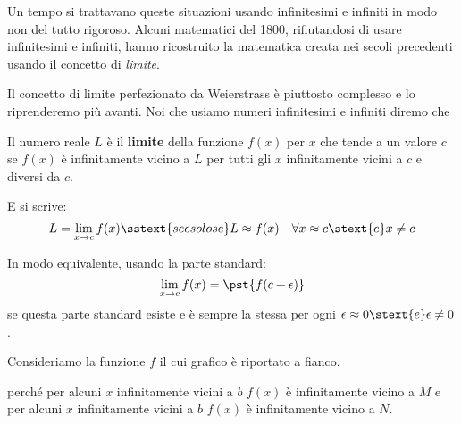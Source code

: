 \vspace{1em}
Un tempo si trattavano queste situazioni usando infinitesimi e infiniti in 
modo non del tutto rigoroso.
Alcuni matematici del 1800, rifiutandosi di usare infinitesimi e infiniti, 
hanno ricostruito la matematica creata nei secoli precedenti usando il 
concetto di
\emph{limite}.

Il concetto di limite perfezionato da Weierstrass è piuttosto complesso e lo 
riprenderemo più avanti.
Noi che usiamo numeri infinitesimi e infiniti diremo che

\begin{definizione}
Il numero reale \(L\) è il \textbf{limite} della funzione \(f(x)\) 
per \(x\) che tende a un valore \(c\) se \(f(x)\) è infinitamente vicino a 
\(L\) per tutti gli \(x\) infinitamente vicini a \(c\) e diversi da \(c\).

E si scrive:
\[L = \lim_{x \rightarrow c} f(x) \sstext{se e solo se} 
L \approx {f(x)} \quad 
\forall x \approx c \stext{ e } x \neq c\]

In modo equivalente, usando la parte standard: 
\[\lim_{x \to c} f(x) = \pst{f(c+\epsilon)}\]
se questa parte standard esiste e è sempre la stessa 
per ogni \(\epsilon \approx 0 \stext{ e } \epsilon \neq 0\).
\end{definizione}

\begin{esempio}
Consideriamo la funzione \(f\) il cui grafico è riportato a fianco.

perché per alcuni \(x\) infinitamente vicini a \(b\) \(f(x)\) è 
infinitamente vicino a \(M\) e per alcuni \(x\) infinitamente vicini a \(b\) 
\(f(x)\) è infinitamente vicino a \(N\).
\end{esempio}


